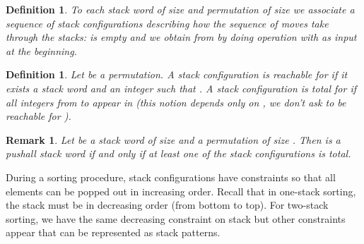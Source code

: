\documentclass[11pt]{article}
\newtheorem{rem}[thm]{Remark}
\newtheorem{defn}[thm]{Definition}
\begin{document}
\begin{defn}
To each stack word  of size  and permutation  of size  we associate a sequence of  stack configurations  describing how the sequence of moves  take  through the stacks:  is empty and we obtain  from  by doing operation  with  as input at the beginning.
\end{defn}


\begin{defn}
Let  be a permutation.
A stack configuration  is {\em reachable} for  if it exists a stack word  and an integer  such that .
A stack configuration  is {\em total} for  if all integers from  to  appear in  (this notion depends only on , we don't ask  to be reachable for ).
\end{defn}


\begin{rem}\label{rem:TotalConfigurations}
Let  be a stack word of size  and  a permutation of size .
Then  is a pushall stack word if and only if at least one of the stack configurations  is total.
\end{rem}


During a sorting procedure, stack configurations have constraints so that all elements can be popped out in increasing order. 
Recall that in one-stack sorting, the stack must be in decreasing order (from bottom to top). 
For two-stack sorting, we have the same decreasing constraint on stack  but other constraints appear that can be represented as stack patterns.
\end{document}
